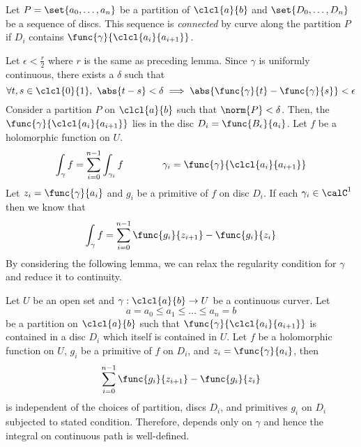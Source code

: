 \begin{definition}
    Let \(P = \set{a_0, \dots , a_n}\) be a partition of \(\clcl{a}{b}\) and \(\set{D_0, \dots , D_n}\) be a sequence of discs. This sequence is \textit{connected} by curve along the partition \(P\) if \(D_i\) contains \(\func{\gamma}{\clcl{a_i}{a_{i+1}}}\).
\end{definition}

Let \(\epsilon < \frac{r}{2}\) where \(r\) is the same as preceding lemma. Since \(\gamma\) is uniformly continuous, there exists a \(\delta\) such that 
\begin{equation*}
    \forall t,s \in \clcl{0}{1}, \ \abs{t-s} < \delta \implies  \abs{\func{\gamma}{t} - \func{\gamma}{s}} < \epsilon
\end{equation*}
Consider a partition \(P\) on \(\clcl{a}{b}\) such that \(\norm{P} < \delta\). Then, the \(\func{\gamma}{\clcl{a_i}{ a_{i+1}}}\) lies in the disc \(D_i = \func{B_{\epsilon}}{a_i}\). Let \(f\) be a holomorphic function on \(U\). 
\begin{equation*}
    \int_{\gamma} f = \sum_{i = 0}^{n-1 } \int_{\gamma_i} f  \qquad \qquad \gamma_i = \func{\gamma}{\clcl{a_i}{a_{i+1}}}
\end{equation*}
Let \(z_i = \func{\gamma}{a_i}\) and \(g_i\) be a primitive of \(f\) on disc \(D_i\). If each \(\gamma_i \in \calC^1\) then we know that 
\begin{equation*}
    \int_{\gamma} f = \sum_{i = 0}^{n-1} \func{g_i}{z_{i+1}} - \func{g_i}{z_{i}}
\end{equation*} 
By considering the following lemma, we can relax the regularity condition for \(\gamma\) and reduce it to continuity. 
\begin{lemma}
    Let \(U\) be an open set and \(\gamma:\clcl{a}{b} \to U\) be a continuous curver. Let 
    \begin{equation*}
        a = a_0 \leq a_1 \leq \dots \leq a_n = b
    \end{equation*}
    be a partition on \(\clcl{a}{b}\) such that \(\func{\gamma}{\clcl{a_i}{ a_{i+1}}}\) is contained in a disc \(D_i\) which itself is contained in \(U\). Let \(f\) be a holomorphic function on \(U\), \(g_i\) be a primitive of \(f\) on \(D_i\), and \(z_i = \func{\gamma}{a_i}\), then 
    \begin{equation*}\label{eq:continuousPathIntegral}
        \sum_{i = 0}^{n-1} \func{g_i}{z_{i+1}} - \func{g_i}{z_{i}}
    \end{equation*}
    is independent of the choices of partition, discs \(D_i\), and primitives \(g_i\) on \(D_i\) subjected to stated condition. Therefore,  depends only on \(\gamma\) and hence the integral on continuous path is well-defined. 

\end{lemma}

